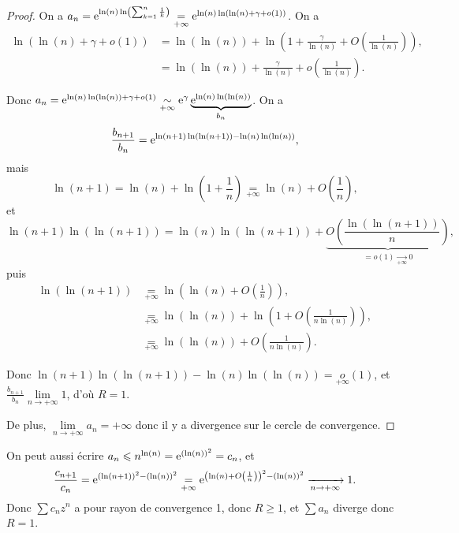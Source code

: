 \documentclass[12pt]{article}
\begin{document}
\begin{proof}
    On a $a_n=\mathrm{e}^{\ln(n)\ln\left(\sum_{k=1}^{n}\frac{1}{k}\right)}\underset{+\infty}{=}\mathrm{e}^{\ln(n)\ln\left(\ln(n)+\gamma+o(1)\right)}$.
    On a 
    \begin{align}
        \ln\left(\ln(n)+\gamma+o(1)\right)
        &=\ln(\ln(n))+\ln\left(1+\frac{\gamma}{\ln(n)}+O\left(\frac{1}{\ln(n)}\right)\right),\\
        &=\ln(\ln(n))+\frac{\gamma}{\ln(n)}+o\left(\frac{1}{\ln(n)}\right).
    \end{align}

    Donc $a_n=\mathrm{e}^{\ln(n)\ln(\ln(n))+\gamma+o(1)}\underset{+\infty}{\sim}\mathrm{e}^{\gamma}\underbrace{\mathrm{e}^{\ln(n)\ln(\ln(n))}}_{b_n}$. On a 
    \begin{equation}
        \frac{b_{n+1}}{b_n}=\mathrm{e}^{\ln(n+1)\ln(\ln(n+1))-\ln(n)\ln(\ln(n))},
    \end{equation}
    mais 
    \begin{equation}
        \ln(n+1)=\ln(n)+\ln\left(1+\frac{1}{n}\right)\underset{+\infty}{=}\ln(n)+O\left(\frac{1}{n}\right),    
    \end{equation}
    et
    \begin{equation}
        \ln(n+1)\ln(\ln(n+1))=\ln(n)\ln(\ln(n+1))+\underbrace{O\left(\frac{\ln(\ln(n+1))}{n}\right)}_{=o(1)\xrightarrow[+\infty]{}0},
    \end{equation}
    puis
    \begin{align}
        \ln(\ln(n+1))
        &\underset{+\infty}{=}\ln\left(\ln(n)+O\left(\frac{1}{n}\right)\right),\\
        &\underset{+\infty}{=}\ln(\ln(n))+\ln\left(1+O\left(\frac{1}{n\ln(n)}\right)\right),\\
        &\underset{+\infty}{=}\ln(\ln(n))+O\left(\frac{1}{n\ln(n)}\right).
    \end{align}

    Donc $\ln(n+1)\ln(\ln(n+1))-\ln(n)\ln(\ln(n))=\underset{+\infty}{o}(1)$, et $\frac{b_{n+1}}{b_{n}}\lim\limits_{n\to+\infty}1$, d'où $R=1$.

    De plus, $\lim\limits_{n\to+\infty}a_n=+\infty$ donc il y a divergence sur le cercle de convergence.
\end{proof}

\begin{remark}
    On peut aussi écrire $a_n\leqslant n^{\ln(n)}=\mathrm{e}^{(\ln(n))^{2}}=c_n$, et 
    \begin{equation}
        \frac{c_{n+1}}{c_{n}}=\mathrm{e}^{\left(\ln(n+1)\right)^{2}-\left(\ln(n)\right)^{2}}\underset{+\infty}{=}\mathrm{e}^{\left(\ln(n)+O\left(\frac{1}{n}\right)\right)^{2}-(\ln(n))^{2}}\xrightarrow[n\to+\infty]{}1.
    \end{equation}
    Donc $\sum c_{n}z^{n}$ a pour rayon de convergence 1, donc $R\geqslant1$, et $\sum a_{n}$ diverge donc $R=1$.
\end{remark}
\end{document}
